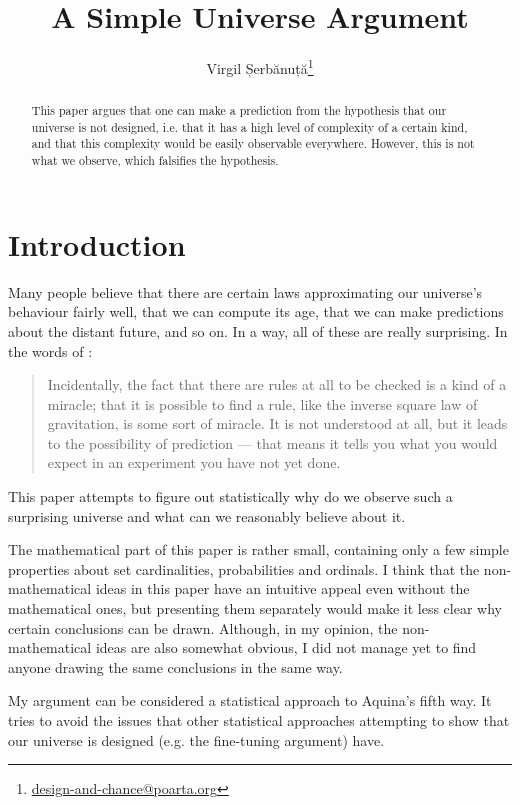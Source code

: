 \documentclass[a4paper
,draft
]{article}
\title{A Simple Universe Argument}
\author{Virgil Șerbănuță\thanks{\href{mailto:design-and-chance@poarta.org}{design-and-chance@poarta.org}}}
\newcommand{\paper}[1]{paper}
\begin{document}
\maketitle

 \begin{abstract}
  This \paper{} argues that one can make a prediction from
  the hypothesis that our universe is not designed, i.e. that it has a high
  level of complexity of a certain kind, and that this complexity would be
  easily observable everywhere. However, this is not what we observe, which
  falsifies the hypothesis.
\end{abstract}

\section{Introduction}

Many people believe
that there are certain laws approximating our universe's behaviour fairly well,
that we can compute its age,
that we can make predictions about the distant future, and so on.
In a way, all of these are really surprising.
In the words of \textcite{Feynman2009}:
\begin{quote}
Incidentally, the fact that there are rules at all to be checked
is a kind of a miracle; that it is possible to find a rule,
like the inverse square law of gravitation, is some sort of miracle.
It is not understood at all, but it leads to the possibility of
prediction --- that means it tells you what you would expect in
an experiment you have not yet done.
\end{quote}

This \paper{} attempts to figure out statistically
why do we observe such a surprising universe and
what can we reasonably believe about it.

The mathematical part of this paper is rather small,
containing only a few simple properties about set cardinalities,
probabilities and ordinals.
I think that the non-mathematical ideas in this paper
have an intuitive appeal even without the mathematical ones,
but presenting them separately would make it less clear why certain
conclusions can be drawn.
Although, in my opinion, the non-mathematical ideas are also somewhat obvious,
I did not manage yet to find anyone drawing the same conclusions
in the same way.

My argument can be considered a statistical approach to Aquina's fifth way.
It tries to avoid the issues that other statistical approaches
attempting to show that our universe is designed
(e.g. the fine-tuning argument) have.
\end{document}

